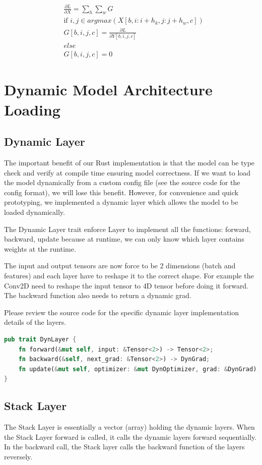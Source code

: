 \documentclass[conference]{IEEEtran}
\begin{document}
\begin{equation}
\begin{split}
&\frac{\partial L}{\partial X} = \sum_h \sum_w G \\
&\text{if }i,j \in argmax(X[b,i:i+h_k,j:j+h_w,c])  \\
& G[b,i,j,c] =
\frac{\partial L}{\partial Y[b,i,j,c]} \\
& else \\
& G[b,i,j,c] = 0 
\end{split}
\end{equation}

\section{Dynamic Model Architecture Loading}
\subsection{Dynamic Layer}
The important benefit of our Rust implementation is that the model can be type check and verify at compile time ensuring model correctness. If we want to load the model dynamically from a custom config file (see the source code for the config format), we will lose this benefit. However, for convenience and quick prototyping, we implemented a dynamic layer which allows the model to be loaded dynamically.

The Dynamic Layer trait enforce Layer to implement all the functions: forward, backward, update because at runtime, we can only know which layer contains weights at the runtime. 

The input and output tensors are now force to be 2 dimensions (batch and features) and each layer have to reshape it to the correct shape. For example the Conv2D need to reshape the input tensor to 4D tensor before doing it forward. The backward function also needs to return a dynamic grad.

Please review the source code for the specific dynamic layer implementation details of the layers.
\begin{lstlisting}[language=Rust, caption={Dynamic Layer Trait}]
pub trait DynLayer {
    fn forward(&mut self, input: &Tensor<2>) -> Tensor<2>;
    fn backward(&self, next_grad: &Tensor<2>) -> DynGrad;
    fn update(&mut self, optimizer: &mut DynOptimizer, grad: &DynGrad);
}
\end{lstlisting}

\subsection{Stack Layer}
The Stack Layer is essentially a vector (array) holding the dynamic layers. When the Stack Layer forward is called, it calls the dynamic layers forward sequentially. In the backward call, the Stack layer calls the backward function of the layers reversely.
\end{document}
